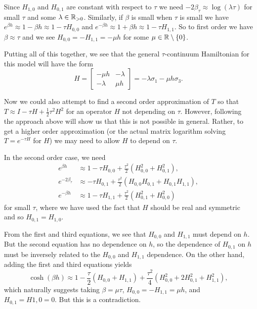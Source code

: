 \documentclass[10pt,reqno]{amsart}
\numberwithin{equation}{section}
\begin{document}
	Since $H_{1,0}$ and $H_{0,1}$ are constant with respect to $\tau$ we need $-2\beta_\tau \approx \log (\lambda\tau)$ for small $\tau$ and some $\lambda\in \mathbb{R}_{>0}$. 
	Similarly, if $\beta$ is small when $\tau$ is small we have $e^{\beta h} \approx 1-\beta h \approx 1-\tau H_{0,0}$ and $e^{-\beta h} \approx 1+\beta h \approx 1-\tau H_{1,1}$. 
	So to first order we have $\beta \approx \tau$ and we see $H_{0,0}=-H_{1,1}=-\mu h$ for some $\mu \in \mathbb{R}\setminus\{0\}$. 
	
	Putting all of this together, we see that the general $\tau$-continuum Hamiltonian for this model will have the form 
	\[ H=\begin{bmatrix}
	-\mu h & -\lambda \\
	-\lambda & \mu h
	\end{bmatrix}=-\lambda\sigma_1-\mu h\sigma_3.\]
	
	Now we could also attempt to find a second order approximation of $T$ so that $T\approx I - \tau H + \frac{1}{2}\tau^2 H^2$ for an operator $H$ not depending on $\tau$. 
	However, following the approach above will show us that this is not possible in general.  
	Rather, to get a higher order approximation (or the actual matrix logarithm solving $T=e^{-\tau H}$ for $H$) we may need to allow $H$ to depend on $\tau$. 
	
	In the second order case, we need 
	\begin{align*}
		e^{\beta h} &\approx 1- \tau H_{0,0}+\frac{\tau^2}{2}(H_{0,0}^2+H_{0,1}^2),\\
		e^{-2\beta_\tau} &\approx -\tau H_{0,1}+\frac{\tau^2}{2}(H_{0,0}H_{0,1}+H_{0,1}H_{1,1}),\\
		e^{-\beta h} &\approx 1 - \tau H_{1,1}+\frac{\tau^2}{2}(H_{0,1}^2+H_{0,0}^2)
	\end{align*}
	for small $\tau$, where we have used the fact that $H$ should be real and symmetric and so $H_{0,1}=H_{1,0}$.
	
	From the first and third equations, we see that $H_{0,0}$ and $H_{1,1}$ must depend on $h$. 
	But the second equation has no dependence on $h$, so the dependence of $H_{0,1}$ on $h$ must be inversely related to the $H_{0,0}$ and $H_{1,1}$ dependence.
	On the other hand, adding the first and third equations yields
	\[\cosh(\beta h) \approx 1-\frac{\tau}{2}( H_{0,0}+ H_{1,1})+\frac{\tau^2}{4}(H_{0,0}^2+2H_{0,1}^2+H_{1,1}^2), \]
	which naturally suggests  taking $\beta=\mu\tau$, $H_{0,0}=-H_{1,1}=\mu h$, and $H_{0,1}=H{1,0}=0$. But this is a contradiction.
	
\end{document}
